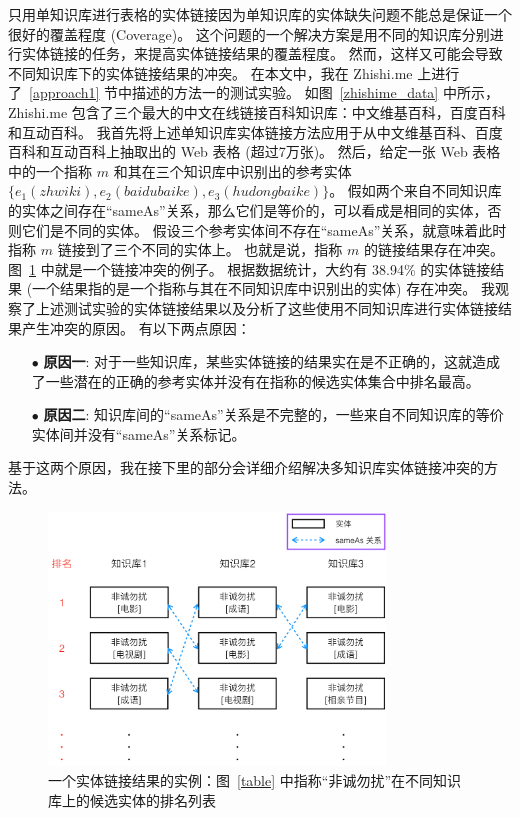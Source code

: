 只用单知识库进行表格的实体链接因为单知识库的实体缺失问题不能总是保证一个很好的覆盖程度 (Coverage)。
这个问题的一个解决方案是用不同的知识库分别进行实体链接的任务，来提高实体链接结果的覆盖程度。
然而，这样又可能会导致不同知识库下的实体链接结果的冲突。
在本文中，我在 Zhishi.me 上进行了~\ref{approach1} 节中描述的方法一的测试实验。
如图~\ref{zhishime_data} 中所示，Zhishi.me 包含了三个最大的中文在线链接百科知识库：中文维基百科，百度百科和互动百科。
我首先将上述单知识库实体链接方法应用于从中文维基百科、百度百科和互动百科上抽取出的 Web 表格 (超过7万张)。
然后，给定一张 Web 表格中的一个指称 $m$ 和其在三个知识库中识别出的参考实体 $\{e_1(zhwiki), e_2(baidubaike), e_3(hudongbaike)\}$。
假如两个来自不同知识库的实体之间存在``sameAs''关系，那么它们是等价的，可以看成是相同的实体，否则它们是不同的实体。
假设三个参考实体间不存在``sameAs''关系，就意味着此时指称 $m$ 链接到了三个不同的实体上。
也就是说，指称 $m$ 的链接结果存在冲突。图~\ref{sameas} 中就是一个链接冲突的例子。
根据数据统计，大约有 38.94\% 的实体链接结果 (一个结果指的是一个指称与其在不同知识库中识别出的实体) 存在冲突。
我观察了上述测试实验的实体链接结果以及分析了这些使用不同知识库进行实体链接结果产生冲突的原因。
有以下两点原因：
\begin{itemize}
  \item[$\bullet$] \textbf{原因一}: 对于一些知识库，某些实体链接的结果实在是不正确的，这就造成了一些潜在的正确的参考实体并没有在指称的候选实体集合中排名最高。
  \item[$\bullet$] \textbf{原因二}: 知识库间的``sameAs''关系是不完整的，一些来自不同知识库的等价实体间并没有``sameAs''关系标记。
\end{itemize}
基于这两个原因，我在接下里的部分会详细介绍解决多知识库实体链接冲突的方法。\par

\begin{figure}[htbp]
\centering
\includegraphics[width=0.8\textwidth]{img/sameas}
\caption{一个实体链接结果的实例：图~\ref{table} 中指称``非诚勿扰''在不同知识库上的候选实体的排名列表}
\label{sameas}
\end{figure}

